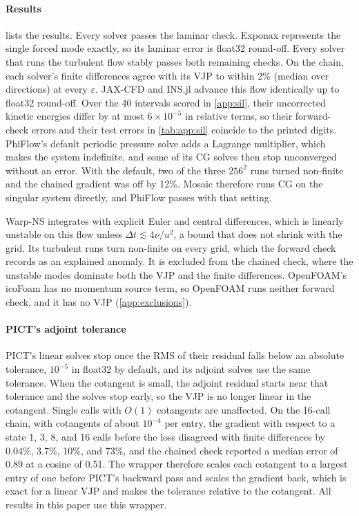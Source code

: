 \paragraph{Results}
 lists the results. Every solver passes the laminar
check. Exponax represents the single forced mode exactly, so its laminar error
is float32 round-off. Every solver that runs the turbulent flow stably passes
both remaining checks. On the chain, each solver's finite differences agree
with its VJP to within 2\% (median over directions) at every $\varepsilon$.
JAX-CFD and INS.jl advance this flow identically up to float32 round-off. Over
the 40 intervals scored in \cref{app:sil}, their uncorrected kinetic energies
differ by at most $6\times10^{-5}$ in relative terms, so their forward-check
errors and their test errors in \cref{tab:app:sil} coincide to the printed
digits. PhiFlow's default periodic pressure
solve adds a Lagrange multiplier, which makes the system indefinite, and some of
its CG solves then stop unconverged without an error. With the default, two of
the three $256^2$ runs turned non-finite and the chained gradient was off by
12\%. Mosaic therefore runs CG on the singular system directly, and PhiFlow
passes with that setting.

Warp-NS integrates with explicit Euler and central differences, which is
linearly unstable on this flow unless $\Delta t \lesssim 4\nu/u^2$, a bound that
does not shrink with the grid. Its turbulent runs turn non-finite on every grid,
which the forward check records as an explained anomaly. It is excluded from
the chained check, where the unstable modes dominate both the VJP and the finite
differences. OpenFOAM's icoFoam has no momentum source term, so OpenFOAM runs
neither forward check, and it has no VJP (\cref{app:exclusions}).

\paragraph{PICT's adjoint tolerance}
PICT's linear solves stop once the RMS of their residual falls below an absolute
tolerance, $10^{-5}$ in float32 by default, and its adjoint solves use the same
tolerance. When the cotangent is small, the adjoint residual starts near that
tolerance and the solves stop early, so the VJP is no longer linear in the
cotangent. Single calls with $O(1)$ cotangents are unaffected. On the 16-call
chain, with cotangents of about $10^{-4}$ per entry, the gradient with respect to
a state 1, 3, 8, and 16 calls before the loss disagreed with finite differences by
0.04\%, 3.7\%, 10\%, and 73\%, and the chained check reported a median error of
0.89 at a cosine of 0.51. The wrapper therefore scales each cotangent to a
largest entry of one before PICT's backward pass and scales the gradient back,
which is exact for a linear VJP and makes the tolerance relative to the
cotangent. All results in this paper use this wrapper.

